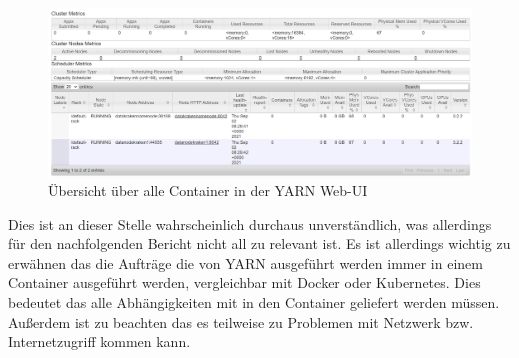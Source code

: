 \documentclass[12pt,oneside,a4paper,parskip]{scrbook}
\begin{document}
\begin{figure}[H]
	\centering
	\includegraphics[scale=0.3]{clusterNodeOverview.png}
	\captionsetup{justification=centering}
	\caption{\"Ubersicht \"uber alle Container in der YARN Web-UI}
	\label{pic:yarnOverview}
\end{figure}
Dies ist an dieser Stelle wahrscheinlich durchaus unverst\"andlich, was allerdings f\"ur den nachfolgenden Bericht nicht all zu relevant ist.
\newline Es ist allerdings wichtig zu erw\"ahnen das die Auftr\"age die von YARN ausgef\"uhrt werden immer in einem Container ausgef\"uhrt werden, vergleichbar mit Docker oder Kubernetes. Dies bedeutet das alle Abh\"angigkeiten mit in den Container geliefert werden m\"ussen. Außerdem ist zu beachten das es teilweise zu Problemen mit Netzwerk bzw. Internetzugriff kommen kann.
\pagebreak
\end{document}
